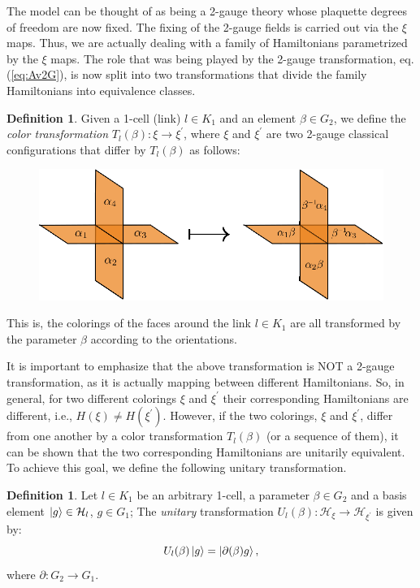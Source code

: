 \documentclass[%
nofootinbib,
 amsmath,amssymb,
aps,
]{revtex4-1}
\theoremstyle{plain}%
\theoremstyle{definition}
\newtheorem{defn}[thm]{Definition}
\theoremstyle{remark}
\begin{document}
The model can be thought of as being a 2-gauge theory whose plaquette degrees of freedom are now fixed. The fixing of the 2-gauge fields is carried out via the $\xi$ maps. Thus, we are actually dealing with a family of Hamiltonians parametrized by the $\xi$ maps. The role that was being played by the 2-gauge transformation, eq. (\ref{eq:Av2G}), is now split into two transformations that divide the family Hamiltonians into equivalence classes. 

\begin{defn}\label{def:coltrans}
Given a 1-cell (link) $l \in K_1$ and an element $\beta \in G_2$, we define the \emph{color transformation} $T_l(\beta):\xi \rightarrow \xi^{\prime}$, where $\xi$ and $\xi^{\prime}$ are two 2-gauge classical configurations that differ by $T_l(\beta)$ as follows:

\begin{figure}[h!]
\centering
\includegraphics[scale=0.8]{color2G.eps}
\label{fig:coltrans}
\end{figure}

This is, the colorings of the faces around the link $l \in K_1$ are all transformed by the parameter $\beta$ according to the orientations. 
\end{defn}
It is important to emphasize that the above transformation is NOT a 2-gauge transformation, as it is actually mapping between different Hamiltonians. So, in general, for two different colorings $\xi$ and $\xi^{\prime}$ their corresponding Hamiltonians are different, i.e., $H(\xi)\neq H(\xi^{\prime})$. However, if the two colorings, $\xi$ and $\xi^{\prime}$, differ from one another by a color transformation $T_l(\beta)$ (or a sequence of them), it can be shown that the two corresponding Hamiltonians are unitarily equivalent. To achieve this goal, we define the following unitary transformation.
\begin{defn}\label{def:unitrans} Let $l \in K_1$ be an arbitrary 1-cell, a parameter $\beta \in G_2$ and a basis element $\ket{g}\in \mathcal{H}_l$, $g \in G_1$; The \emph{unitary} transformation $U_l(\beta):\mathcal{H}_\xi \rightarrow \mathcal{H}_{\xi^{\prime}}$ is given by:
\[U_l(\beta)\ket{g}=\ket{\partial(\beta)g},\]
where $\partial:G_2 \rightarrow G_1$.
\end{defn}
\end{document}
